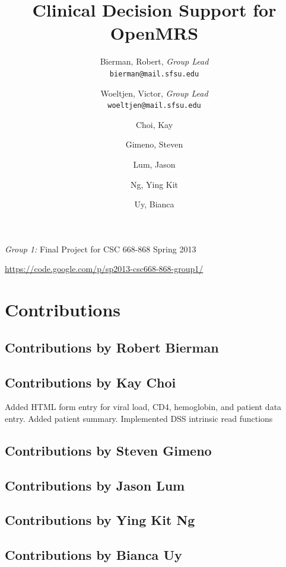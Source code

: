 \documentclass[12pt,letterpaper]{article}
\title{
  Clinical Decision Support for OpenMRS
}
\author{
        Bierman, Robert,  \emph{Group Lead}  \\ \texttt{bierman@mail.sfsu.edu} \and 
        Woeltjen, Victor, \emph{Group Lead}  \\ \texttt{woeltjen@mail.sfsu.edu} \and
        Choi, Kay       \and
        Gimeno, Steven  \and
        Lum, Jason      \and
        Ng, Ying Kit    \and
        Uy, Bianca      
}
\begin{document}
\newpage 

\maketitle
\begin{center}
\begin{Large}\emph{Group 1:} Final Project for CSC 668-868 Spring 2013\end{Large} \linebreak
\url{https://code.google.com/p/sp2013-csc668-868-group1/}
\end{center}
\thispagestyle{empty} %

\newpage {}
\tableofcontents


\newpage {}
\section{Contributions} 

\subsection{Contributions by Robert Bierman}

\subsection{Contributions by Kay Choi}
Added HTML form entry for viral load, CD4, hemoglobin, and 
patient data entry. Added patient summary. Implemented DSS intrinsic read 
functions

\subsection{Contributions by Steven Gimeno}

\subsection{Contributions by Jason Lum}

\subsection{Contributions by Ying Kit Ng}

\subsection{Contributions by Bianca Uy}
\end{document}
